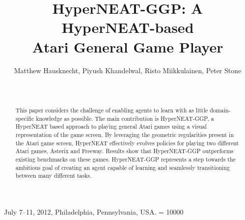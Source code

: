 \documentclass{sig-alternate}
\begin{document}
 {July 7--11, 2012, Philadelphia, Pennsylvania, USA.}
\widowpenalty = 10000
\title{HyperNEAT-GGP: A HyperNEAT-based \\Atari General Game Player}

%
\author{
\alignauthor
Matthew Hausknecht, Piyush Khandelwal, Risto Miikkulainen, Peter Stone\\
       \\
       \\
}

\maketitle
\begin{abstract}
This paper considers the challenge of enabling agents to learn with as little domain-specific knowledge as possible. The main contribution is HyperNEAT-GGP, a HyperNEAT based approach to playing general Atari games using a visual representation of the game screen. By leveraging the geometric regularities present in the Atari game screen, HyperNEAT effectively evolves policies for playing two different Atari games, Asterix and Freeway. Results show that HyperNEAT-GGP outperforms existing benchmarks on these games. HyperNEAT-GGP represents a step towards the ambitious goal of creating an agent capable of learning and seamlessly transitioning between many different tasks.
\end{abstract}



\end{document}

